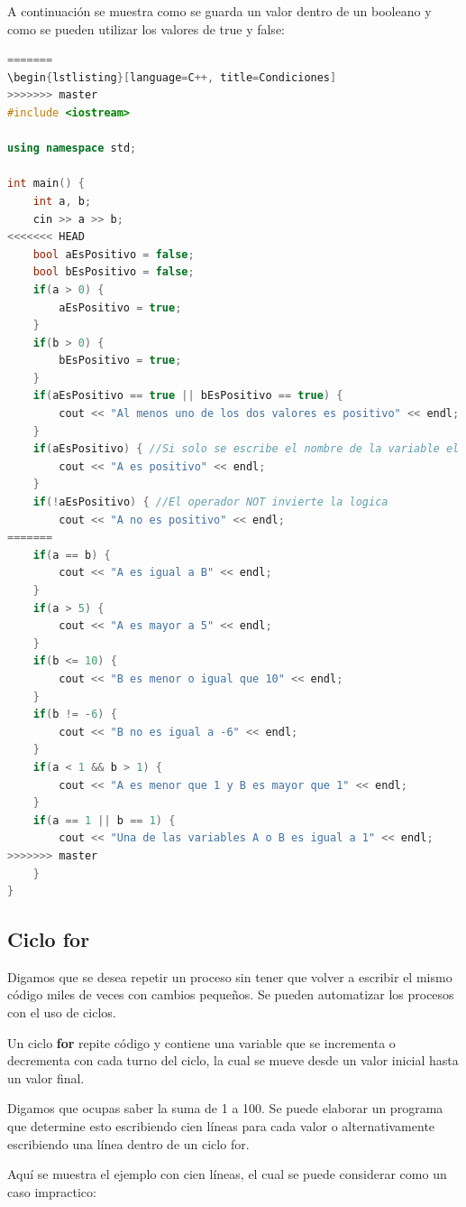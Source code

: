 \documentclass{article}
\begin{document}
A continuación se muestra como se guarda un valor dentro de un booleano y como se pueden utilizar los valores de true y false:

\begin{lstlisting}[language=C++, title=Booleanos]
=======
\begin{lstlisting}[language=C++, title=Condiciones]
>>>>>>> master
#include <iostream>

using namespace std;

int main() {
	int a, b;
	cin >> a >> b;
<<<<<<< HEAD
	bool aEsPositivo = false;
	bool bEsPositivo = false;
	if(a > 0) {
		aEsPositivo = true;
	}
	if(b > 0) {
		bEsPositivo = true;
	}
	if(aEsPositivo == true || bEsPositivo == true) {
		cout << "Al menos uno de los dos valores es positivo" << endl;
	}
	if(aEsPositivo) { //Si solo se escribe el nombre de la variable el programa automaticamente checa si es verdadero
		cout << "A es positivo" << endl;
	}
	if(!aEsPositivo) { //El operador NOT invierte la logica
		cout << "A no es positivo" << endl;
=======
	if(a == b) {
		cout << "A es igual a B" << endl;
	}
	if(a > 5) {
		cout << "A es mayor a 5" << endl;
	}
	if(b <= 10) {
		cout << "B es menor o igual que 10" << endl;
	}
	if(b != -6) {
		cout << "B no es igual a -6" << endl;
	}
	if(a < 1 && b > 1) {
		cout << "A es menor que 1 y B es mayor que 1" << endl;
	}
	if(a == 1 || b == 1) {
		cout << "Una de las variables A o B es igual a 1" << endl;
>>>>>>> master
	}
}
\end{lstlisting}

\subsection{Ciclo for}

Digamos que se desea repetir un proceso sin tener que volver a escribir el mismo código miles de veces con cambios pequeños. Se pueden automatizar los procesos con el uso de ciclos.

Un ciclo \textbf{for} repite código y contiene una variable que se incrementa o decrementa con cada turno del ciclo, la cual se mueve desde un valor inicial hasta un valor final.

Digamos que ocupas saber la suma de 1 a 100. Se puede elaborar un programa que determine esto escribiendo cien líneas para cada valor o alternativamente escribiendo una línea dentro de un ciclo for.

Aquí se muestra el ejemplo con cien líneas, el cual se puede considerar como un caso impractico:
\end{document}
